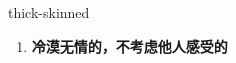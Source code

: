 
\begin{frame}
{\huge thick-skinned}
\begin{center}
\begin{enumerate}\Large
  \item \textbf{冷漠无情的，不考虑他人感受的}
\end{enumerate}
\end{center}
\end{frame}
